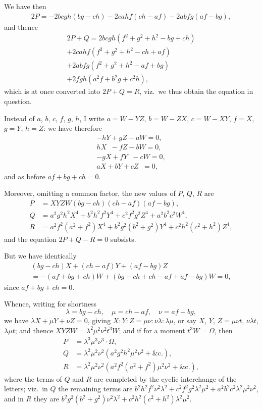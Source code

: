 \documentclass[11pt,a4paper]{article}
\theoremstyle{plain}
\theoremstyle{definition}
\theoremstyle{remark}
\begin{document}
We have then
\begin{multline*}
2P = -2bcgh(bg - ch) - 2cahf(ch - af) - 2abfg(af - bg),
\end{multline*}
and thence
\begin{multline*}
2P + Q = 2bcgh(f^2 + g^2 + h^2 - bg + ch) \\
+ 2cahf(f^2 + g^2 + h^2 - ch + af) \\
+ 2abfg(f^2 + g^2 + h^2 - af + bg) \\
+ 2fgh(a^2f + b^2g + c^2h),
\end{multline*}
which is at once converted into $2P + Q = R$, viz.\ we thus obtain the equation in question.

\newpage

Instead of $a$, $b$, $c$, $f$, $g$, $h$, I write $a = W - YZ$, $b = W - ZX$, $c = W - XY$, $f = X$, $g = Y$, $h = Z$: we have therefore
\begin{gather*}
-hY + gZ - aW = 0, \\
hX \;\; - fZ - bW = 0, \\
-gX + fY \;\; - cW = 0, \\
aX + bY + cZ \;\; = 0,
\end{gather*}
and as before $af + bg + ch = 0$.

Moreover, omitting a common factor, the new values of $P$, $Q$, $R$ are
\begin{align*}
P &= XYZW(bg - ch)(ch - af)(af - bg), \\
Q &= a^2g^2h^2X^4 + b^2h^2f^2Y^4 + c^2f^2g^2Z^4 + a^2b^2c^2W^4, \\
R &= a^2f^2(a^2 + f^2)X^4 + b^2g^2(b^2 + g^2)Y^4 + c^2h^2(c^2 + h^2)Z^4,
\end{align*}
and the equation $2P + Q - R = 0$ subsists.

But we have identically
\begin{multline*}
(bg - ch)X + (ch - af)Y + (af - bg)Z \\
= -(af + bg + ch)W + (bg - ch + ch - af + af - bg)W = 0,
\end{multline*}
since $af + bg + ch = 0$.

Whence, writing for shortness
\[
\lambda = bg - ch, \quad \mu = ch - af, \quad \nu = af - bg,
\]
we have $\lambda X + \mu Y + \nu Z = 0$, giving $X : Y : Z = \mu\nu : \nu\lambda : \lambda\mu$, or say $X$, $Y$, $Z = \mu\nu t$, $\nu\lambda t$, $\lambda\mu t$; and thence $XYZW = \lambda^2\mu^2\nu^2 t^3 W$; and if for a moment $t^3 W = \Omega$, then
\begin{align*}
P &= \lambda^3\mu^3\nu^3 \cdot \Omega, \\
Q &= \lambda^2\mu^2\nu^2(a^2g^2h^2\mu^2\nu^2 + \&\text{c.}), \\
R &= \lambda^2\mu^2\nu^2(a^2f^2(a^2+f^2)\mu^2\nu^2 + \&\text{c.}),
\end{align*}
where the terms of $Q$ and $R$ are completed by the cyclic interchange of the letters; viz.\ in $Q$ the remaining terms are $b^2h^2f^2\nu^2\lambda^2 + c^2f^2g^2\lambda^2\mu^2 + a^2b^2c^2\lambda^2\mu^2\nu^2$, and in $R$ they are $b^2g^2(b^2+g^2)\nu^2\lambda^2 + c^2h^2(c^2+h^2)\lambda^2\mu^2$.
\end{document}
